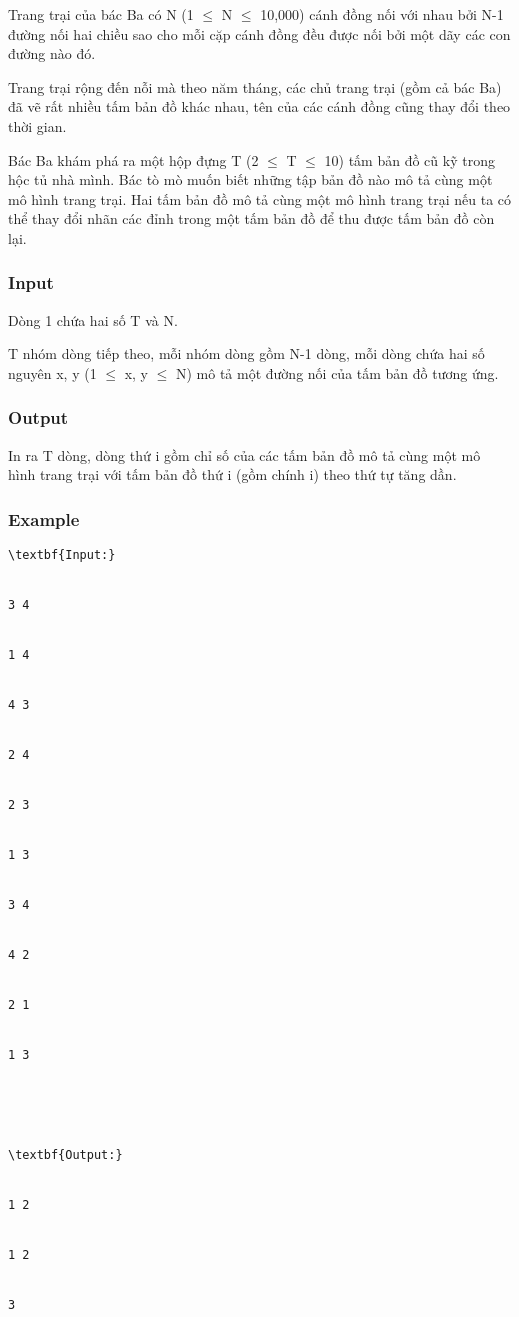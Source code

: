 



   Trang trại của bác Ba có N (1  $\le$  N  $\le$  10,000) cánh đồng nối với nhau bởi N-1 đường nối hai chiều sao cho mỗi cặp cánh đồng đều được nối bởi một dãy các con đường nào đó.  

   Trang trại rộng đến nỗi mà theo năm tháng, các chủ trang trại (gồm cả bác Ba) đã vẽ rất nhiều tấm bản đồ khác nhau, tên của các cánh đồng cũng thay đổi theo thời gian.  

   Bác Ba khám phá ra một hộp đựng T (2  $\le$  T  $\le$  10) tấm bản đồ cũ kỹ trong hộc tủ nhà mình. Bác tò mò muốn biết những tập bản đồ nào mô tả cùng một mô hình trang trại. Hai tấm bản đồ mô tả cùng một mô hình trang trại nếu ta có thể thay đổi nhãn các đỉnh trong một tấm bản đồ để thu được tấm bản đồ còn lại.  

\subsubsection{   Input  }

   Dòng 1 chứa hai số T và N.  

   T nhóm dòng tiếp theo, mỗi nhóm dòng gồm N-1 dòng, mỗi dòng chứa hai số nguyên x, y (1  $\le$  x, y  $\le$  N) mô tả một đường nối của tấm bản đồ tương ứng.  

\subsubsection{   Output  }

   In ra T dòng, dòng thứ i gồm chỉ số của các tấm bản đồ mô tả cùng một mô hình trang trại với tấm bản đồ thứ i (gồm chính i) theo thứ tự tăng dần.  

\subsubsection{   Example  }
\begin{verbatim}
\textbf{Input:}


3 4


1 4


4 3


2 4


2 3


1 3


3 4


4 2


2 1


1 3





\textbf{Output:}


1 2


1 2


3\end{verbatim}
